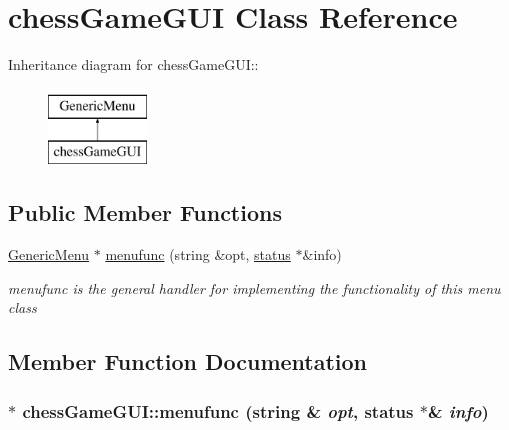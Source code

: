 \hypertarget{classchessGameGUI}{
\section{chessGameGUI Class Reference}
\label{classchessGameGUI}
}
Inheritance diagram for chessGameGUI::\begin{figure}[H]
\begin{center}
\leavevmode
\includegraphics[height=2cm]{classchessGameGUI}
\end{center}
\end{figure}
\subsection*{Public Member Functions}
\begin{DoxyCompactItemize}
\item 
\hyperlink{classGenericMenu}{GenericMenu} $\ast$ \hyperlink{classchessGameGUI_afcafe4d3b432bae7cd8439b689886a8d}{menufunc} (string \&opt, \hyperlink{classstatus}{status} $\ast$\&info)
\begin{DoxyCompactList}\small\item\em menufunc is the general handler for implementing the functionality of this menu class \item\end{DoxyCompactList}\end{DoxyCompactItemize}


\subsection{Member Function Documentation}
\hypertarget{classchessGameGUI_afcafe4d3b432bae7cd8439b689886a8d}{
\subsubsection[{menufunc}]{ $\ast$ chessGameGUI::menufunc (string \& {\em opt}, \/  {\bf status} $\ast$\& {\em info})}}
\label{classchessGameGUI_afcafe4d3b432bae7cd8439b689886a8d}


